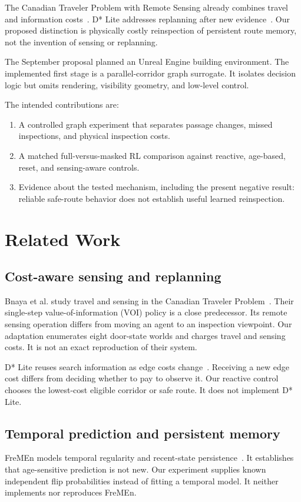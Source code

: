 \documentclass[journal]{IEEEtai}
\begin{document}
The Canadian Traveler Problem with Remote Sensing already combines travel and information costs~\cite{Bnaya2009CTPSensing}. D* Lite addresses replanning after new evidence~\cite{Koenig2002DStarLite}. Our proposed distinction is physically costly reinspection of persistent route memory, not the invention of sensing or replanning.

The September proposal planned an Unreal Engine building environment. The implemented first stage is a parallel-corridor graph surrogate. It isolates decision logic but omits rendering, visibility geometry, and low-level control.

The intended contributions are:
\begin{enumerate}
\item A controlled graph experiment that separates passage changes, missed inspections, and physical inspection costs.
\item A matched full-versus-masked RL comparison against reactive, age-based, reset, and sensing-aware controls.
\item Evidence about the tested mechanism, including the present negative result: reliable safe-route behavior does not establish useful learned reinspection.
\end{enumerate}

\section{Related Work}
\subsection{Cost-aware sensing and replanning}
Bnaya et al. study travel and sensing in the Canadian Traveler Problem~\cite{Bnaya2009CTPSensing}. Their single-step value-of-information (VOI) policy is a close predecessor. Its remote sensing operation differs from moving an agent to an inspection viewpoint. Our adaptation enumerates eight door-state worlds and charges travel and sensing costs. It is not an exact reproduction of their system.

D* Lite reuses search information as edge costs change~\cite{Koenig2002DStarLite}. Receiving a new edge cost differs from deciding whether to pay to observe it. Our reactive control chooses the lowest-cost eligible corridor or safe route. It does not implement D* Lite.

\subsection{Temporal prediction and persistent memory}
FreMEn models temporal regularity and recent-state persistence~\cite{Krajnik2017FreMEn}. It establishes that age-sensitive prediction is not new. Our experiment supplies known independent flip probabilities instead of fitting a temporal model. It neither implements nor reproduces FreMEn.
\end{document}
